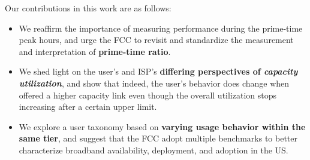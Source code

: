 Our contributions in this work are as follows:
\begin{itemize}
\itemsep0em
\item We reaffirm the importance of measuring performance during the prime-time peak hours, and urge the FCC to revisit and standardize the measurement and interpretation of \textbf{prime-time ratio}. 
\item We shed light on the user's and ISP's \textbf{differing perspectives of \emph{capacity utilization}}, and show that indeed, the user's behavior does change when offered a higher capacity link even though the overall utilization stops increasing after a certain upper limit.
\item We explore a user taxonomy based on \textbf{varying usage behavior within the same tier}, and suggest that the FCC adopt multiple benchmarks to better characterize broadband availability, deployment, and adoption in the US.
\end{itemize}



